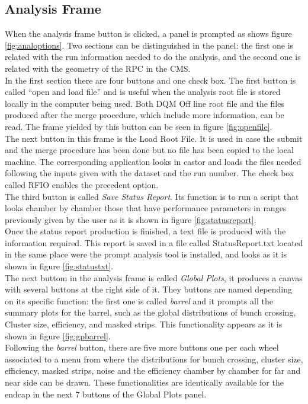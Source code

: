 \documentclass[11pt]{amsart}
\begin{document}
\subsection{Analysis Frame}
When the analysis frame button is clicked, a panel is prompted as shows figure \ref{fig:analoptions}. Two sections can be distinguished in the panel: the first one is related with the run information needed to do the analysis, and the second one is related with the geometry of the RPC in the CMS.\\ 
In the first section there are four buttons and one check box. The first button is called ``open and load file'' and is useful when the analysis root file is stored locally in the computer being used.  Both DQM Off line root file and the files produced after the merge procedure, which include more information, can be read. The frame yielded by this button can be seen in figure \ref{fig:openfile}.\\
The next button in this frame is the Load Root File. It is used in case the submit and the merge procedure has been done but no file has been copied  to the local machine. The corresponding application looks in castor and loads the files needed following the inputs given with the dataset and the run number. The check box called RFIO enables the precedent option.\\
The third button is called \textit{Save Status Report}. Its function is to run a script that looks chamber by chamber those that have performance parameters in ranges previously given by the user as it is shown in figure \ref{fig:statusreport}.\\
Once the status report production is finished, a text file is produced with the information required. This report is saved in a file called StatusReport.txt located in the same place were the prompt analysis tool is installed, and looks as it is shown in figure \ref{fig:statustxt}.\\
The next buttom in the analysis frame is called \textit{Global Plots}, it produces a canvas with several buttons at the right side of it. They buttons are named depending on its specific function: the first one is called \textit{barrel} and it prompts all the summary plots for the barrel, such as  the global distributions of bunch crossing, Cluster size, efficiency, and masked strips. This functionality appears as it is shown in figure \ref{fig:gpbarrel}.\\
Following the \textit{barrel} button, there are five more buttons one per each wheel associated to a menu from where the distributions for bunch crossing, cluster size, efficiency, masked strips, noise and the efficiency chamber by chamber for far and near side can be drawn.  These functionalities are identically available for the endcap in the next 7 buttons of the Global Plots panel. \\
\end{document}
